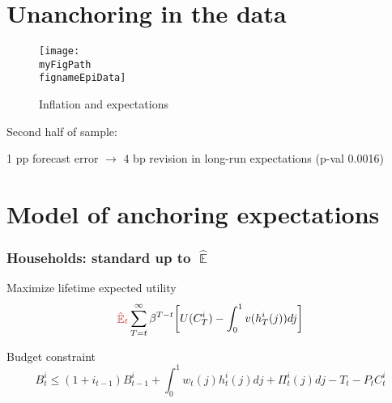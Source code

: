 \documentclass[10pt]{beamer}
\def \myFigPath {../../../figures/}
\DeclareMathOperator{\E}{\mathbb{E}}
\def\mySmallerFigScale{0.18}
\def\fignameEpiData{epi_in_data_command_anchoring_in_data_29_Aug_2020_12_10_41}
\def\fignameAlphaHat{alph_opt_constant_only_pi_only_N_100_nfe_5femax_2_loss_382_gridspacing_manual_Wdiffs2_100000_Wmid_1000_Nsimulations_scaleW_0_use_expectations_0_use_meas_error_0_command_GMM_LOMgain_univariate_12_Aug_2020_09_16_29}
\begin{document}
\section{Unanchoring in the data}

\begin{frame}

\begin{figure}[h!]
\caption{Inflation and expectations}
\texttt{[image: \\myFigPath \\fignameEpiData]}
\label{pi_epi}
\end{figure}

\vspace{0.1cm}

Second half of sample:

1 pp forecast error $\rightarrow$ 4 bp revision in long-run expectations (p-val 0.0016)
\end{frame}

%
%
%

\section{Model of anchoring expectations}

\begin{frame}
	\frametitle{Households: standard up to $\hat{\E}$}
	\label{HH}

Maximize lifetime expected utility
\begin{equation}
\textcolor{brownreddark}{\hat{\E}_t}\sum^{\infty}_{T=t}\beta^{T-t} \bigg[ U(C^i_T) - \int_0^1 v(h^i_T(j)) dj \bigg]
\label{lifetime_U}
\end{equation}	

Budget constraint
\begin{equation}
 B^i_t \leq (1+i_{t-1})B^i_{t-1} + \int_0^1 w_t(j)h^i_t(j) dj + \Pi_t^i(j)  dj-T_t -P_tC^i_t
 \label{BC}
\end{equation}



\vfill

\hfill \hyperlink{details_HHs_firms}{}
\end{frame}
\end{document}
